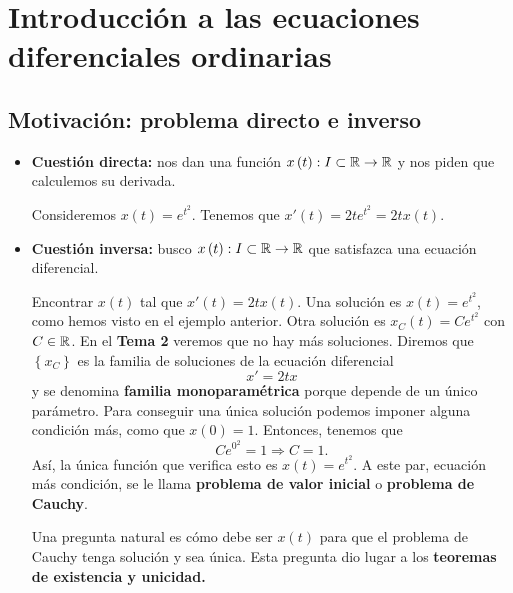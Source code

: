 \chapter{Introducción a las ecuaciones diferenciales ordinarias}

\section{Motivación: problema directo e inverso}

\begin{itemize}
\item \textbf{Cuestión directa:} nos dan una función $\displaystyle x\left(t\right) : I \subset \mathbb{R} \to \mathbb{R} $ y nos piden que calculemos su derivada.
\begin{eg}
Consideremos $\displaystyle x\left(t\right) = e^{t ^{2}} $. Tenemos que $\displaystyle x'\left(t\right) = 2te^{t ^{2}} = 2tx\left(t\right) $. 
\end{eg}
\item \textbf{Cuestión inversa:} busco $\displaystyle x\left(t\right) : I \subset \mathbb{R} \to \mathbb{R}$ que satisfazca una ecuación diferencial. 
\begin{eg}
	Encontrar $\displaystyle x\left(t\right) $ tal que $\displaystyle x'\left(t\right) = 2tx\left(t\right) $. Una solución es $\displaystyle x\left(t\right) = e^{t ^{2}} $, como hemos visto en el ejemplo anterior. Otra solución es $\displaystyle x_{C}\left(t\right) = Ce^{t ^{2}} $ con $\displaystyle C \in \mathbb{R} $. En el \textbf{Tema 2} veremos que no hay más soluciones. Diremos que $\displaystyle \left\{ x_{C}\right\}  $ es la familia de soluciones de la ecuación diferencial
	\[x' = 2tx \]	
	y se denomina \textbf{familia monoparamétrica} porque depende de un único parámetro. Para conseguir una única solución podemos imponer alguna condición más, como que $\displaystyle x\left(0\right) = 1 $. Entonces, tenemos que 
	\[Ce^{0 ^{2}} = 1 \Rightarrow C = 1 .\]
	Así, la única función que verifica esto es $\displaystyle x\left(t\right) = e^{t ^{2}} $. A este par, ecuación más condición, se le llama \textbf{problema de valor inicial} o \textbf{problema de Cauchy}. 
\end{eg}
\begin{observation}
Una pregunta natural es cómo debe ser $\displaystyle x\left(t\right) $ para que el problema de Cauchy tenga solución y sea única. Esta pregunta dio lugar a los \textbf{teoremas de existencia y unicidad.} 
\end{observation}
\end{itemize}

